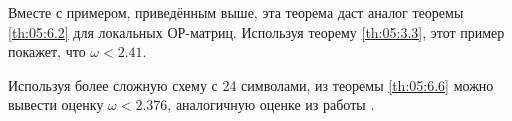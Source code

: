 Вместе с примером, приведённым выше, эта теорема даст аналог теоремы \ref{th:05:6.2} для локальных ОР-матриц. Используя теорему \ref{th:05:3.3}, этот пример покажет, что $\omega < 2.41$.

Используя более сложную схему с 24 символами, из теоремы \ref{th:05:6.6} можно вывести оценку $\omega < 2.376$, аналогичную оценке из работы \cite{Coppersmith:1990}.






















